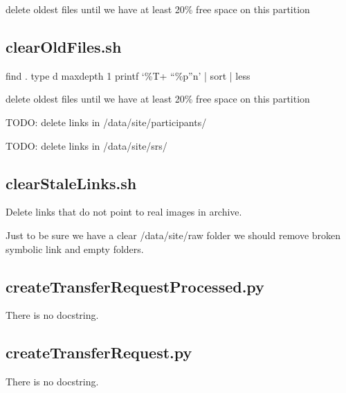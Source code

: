 \documentclass[letterpaper,10pt,english]{sphinxmanual}
\begin{document}
\sphinxAtStartPar
delete oldest files until we have at least 20\% free space on this partition

\sphinxstepscope


\subsection{clearOldFiles.sh}
\label{\detokenize{Architecture/scripts/clearOldFiles:clearoldfiles-sh}}\label{\detokenize{Architecture/scripts/clearOldFiles::doc}}
\sphinxAtStartPar
find . \sphinxhyphen{}type d \sphinxhyphen{}maxdepth 1 \sphinxhyphen{}printf ‘\%T+ “\%p”n’ | sort | less

\sphinxAtStartPar
delete oldest files until we have at least 20\% free space on this partition

\sphinxAtStartPar
TODO: delete links in /data/site/participants/

\sphinxAtStartPar
TODO: delete links in /data/site/srs/

\sphinxstepscope


\subsection{clearStaleLinks.sh}
\label{\detokenize{Architecture/scripts/clearStaleLinks:clearstalelinks-sh}}\label{\detokenize{Architecture/scripts/clearStaleLinks::doc}}
\sphinxAtStartPar
Delete links that do not point to real images in archive.

\sphinxAtStartPar
Just to be sure we have a clear /data/site/raw folder we should remove broken symbolic link and empty folders.

\sphinxstepscope


\subsection{createTransferRequestProcessed.py}
\label{\detokenize{Architecture/scripts/createTransferRequestForProcessed:createtransferrequestprocessed-py}}\label{\detokenize{Architecture/scripts/createTransferRequestForProcessed::doc}}
\sphinxAtStartPar
There is no docstring.

\sphinxstepscope


\subsection{createTransferRequest.py}
\label{\detokenize{Architecture/scripts/createTransferRequest:createtransferrequest-py}}\label{\detokenize{Architecture/scripts/createTransferRequest::doc}}
\sphinxAtStartPar
There is no docstring.
\end{document}
